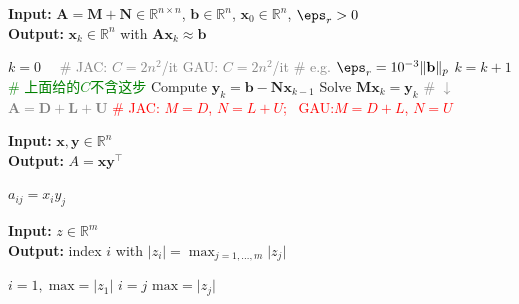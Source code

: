 \documentclass{note}
\begin{document}
\begin{multicols}{3}

\begin{algorithm}[H]
\tiny
\caption*{\textbf{|JAC|GAU} \quad {} \quad | \quad {}}
\textbf{Input:} $\mathbf{A} = \mathbf{M} + \mathbf{N} \in \mathbb{R}^{n \times n}$, $\mathbf{b} \in \mathbb{R}^n$, $\mathbf{x}_0\in \mathbb{R}^n$, $\eps_r>0$ \\
\textbf{Output:} $\mathbf{x}_k \in \mathbb{R}^n$ with $\mathbf{Ax}_k \approx \mathbf{b}$
\begin{algorithmic}[1]
  \State $k = 0$ \ \ \textcolor{gray}{\tiny \# JAC: $C=2n^2$/it \quad GAU: $C=2n^2$/it}
   \quad \textcolor{gray}{\tiny \# e.g. $\eps_r=10^{-3}\|\mathbf{b}\|_p$}
    \State $k = k + 1$ \quad \textcolor{green}{\tiny \# 上面给的$C$不含这步}
    \State Compute $\mathbf{y}_k = \mathbf{b}-\mathbf{N}\mathbf{x}_{k-1}$
    \State Solve $\mathbf{M}\mathbf{x}_k = \mathbf{y}_k$ \quad \textcolor{gray}{\tiny \# $\downarrow$ $\mathbf{A}=\mathbf{D}+\mathbf{L}+\mathbf{U}$}
  \EndWhile \quad \textcolor{red}{\tiny \# JAC: $M=D$, $N=L+U$; \ GAU:$M=D+L$, $N=U$}
\end{algorithmic}
\end{algorithm}

\begin{algorithm}[H]
\tiny
\caption*{\textbf{OP} Outer product \quad \ps{$C = \sum_{i=1}^{n}\sum_{j=1}^{n} 1 = n^2=\Ocal(n^2)$}}
\textbf{Input:} $\mathbf{x}, \mathbf{y} \in \mathbb{R}^n$ \\
\textbf{Output:} $A = \mathbf{x}\mathbf{y}^\top$
\begin{algorithmic}[1]
      \State $a_{ij} = x_i y_j$
    \EndFor
  \EndFor
\end{algorithmic}
\end{algorithm}

\begin{algorithm}[H]
\tiny
\caption*{\textbf{Max} Finding index of maximum \quad \ps{$C(m) = m - 1$}}
\textbf{Input:} $z \in \mathbb{R}^m$\\
\textbf{Output:} index $i$ with $\lvert z_i\rvert = \max_{j=1,\dots,m}\lvert z_j\rvert$
\begin{algorithmic}[1]
  \State $i = 1,\;\mathrm{max}= \lvert z_1\rvert$
      \State $i = j$
      \State $\mathrm{max} = \lvert z_j\rvert$
    \EndIf
  \EndFor
\end{algorithmic}
\end{algorithm}

\end{multicols}
\end{document}
